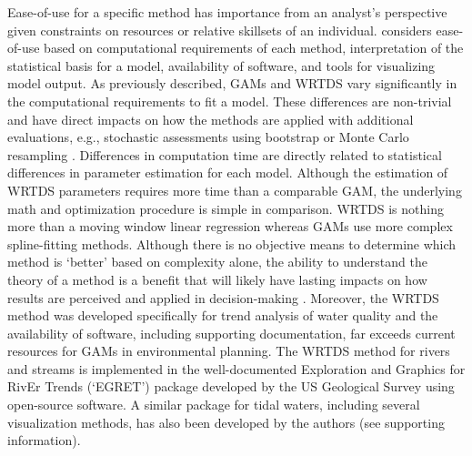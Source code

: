 \documentclass[letterpaper,12pt,oneside]{article}\usepackage[]{graphicx}\usepackage[]{color}
\begin{document}
Ease-of-use for a specific method has importance from an analyst's perspective given constraints on resources or relative skillsets of an individual.   considers ease-of-use based on computational requirements of each method, interpretation of the statistical basis for a model, availability of software, and tools for visualizing model output.  As previously described, \acp{GAM} and \ac{WRTDS} vary significantly in the computational requirements to fit a model.  These differences are non-trivial and have direct impacts on how the methods are applied with additional evaluations, e.g., stochastic assessments using bootstrap or Monte Carlo resampling \citep{Efron93,Hirsch15}.  Differences in computation time are directly related to statistical differences in parameter estimation for each model.  Although the estimation of \ac{WRTDS} parameters requires more time than a comparable \ac{GAM}, the underlying math and optimization procedure is simple in comparison.  \ac{WRTDS} is nothing more than a moving window linear regression whereas \acp{GAM} use more complex spline-fitting methods.  Although there is no objective means to determine which method is `better' based on complexity alone, the ability to understand the theory of a method is a benefit that will likely have lasting impacts on how results are perceived and applied in decision-making \citep{Carpenter95}.  Moreover, the \ac{WRTDS} method was developed specifically for trend analysis of water quality and the availability of software, including supporting documentation, far exceeds current resources for \acp{GAM} in environmental planning.  The \ac{WRTDS} method for rivers and streams is implemented in the well-documented Exploration and Graphics for RivEr Trends (`EGRET') package \citep{Hirsch14} developed by the US Geological Survey using open-source software.  A similar package for tidal waters, including several visualization methods, has also been developed by the authors (see supporting information). 
\end{document}

